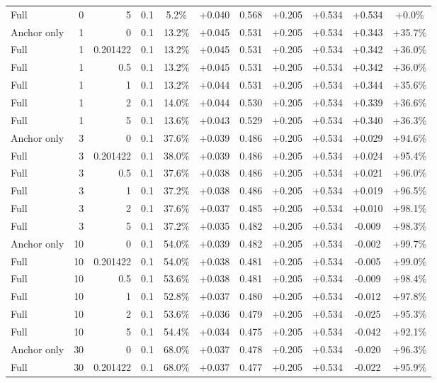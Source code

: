 \begin{table}[htbp]
\begin{tabular}{lrrrccccccc}
Full & 0 & 5 & 0.1 & 5.2\% & +0.040 & 0.568 & +0.205 & +0.534 & +0.534 & +0.0\% \\
Anchor only & 1 & 0 & 0.1 & 13.2\% & +0.045 & 0.531 & +0.205 & +0.534 & +0.343 & +35.7\% \\
Full & 1 & 0.201422 & 0.1 & 13.2\% & +0.045 & 0.531 & +0.205 & +0.534 & +0.342 & +36.0\% \\
Full & 1 & 0.5 & 0.1 & 13.2\% & +0.045 & 0.531 & +0.205 & +0.534 & +0.342 & +36.0\% \\
Full & 1 & 1 & 0.1 & 13.2\% & +0.044 & 0.531 & +0.205 & +0.534 & +0.344 & +35.6\% \\
Full & 1 & 2 & 0.1 & 14.0\% & +0.044 & 0.530 & +0.205 & +0.534 & +0.339 & +36.6\% \\
Full & 1 & 5 & 0.1 & 13.6\% & +0.043 & 0.529 & +0.205 & +0.534 & +0.340 & +36.3\% \\
Anchor only & 3 & 0 & 0.1 & 37.6\% & +0.039 & 0.486 & +0.205 & +0.534 & +0.029 & +94.6\% \\
Full & 3 & 0.201422 & 0.1 & 38.0\% & +0.039 & 0.486 & +0.205 & +0.534 & +0.024 & +95.4\% \\
Full & 3 & 0.5 & 0.1 & 37.6\% & +0.038 & 0.486 & +0.205 & +0.534 & +0.021 & +96.0\% \\
Full & 3 & 1 & 0.1 & 37.2\% & +0.038 & 0.486 & +0.205 & +0.534 & +0.019 & +96.5\% \\
Full & 3 & 2 & 0.1 & 37.6\% & +0.037 & 0.485 & +0.205 & +0.534 & +0.010 & +98.1\% \\
Full & 3 & 5 & 0.1 & 37.2\% & +0.035 & 0.482 & +0.205 & +0.534 & -0.009 & +98.3\% \\
Anchor only & 10 & 0 & 0.1 & 54.0\% & +0.039 & 0.482 & +0.205 & +0.534 & -0.002 & +99.7\% \\
Full & 10 & 0.201422 & 0.1 & 54.0\% & +0.038 & 0.481 & +0.205 & +0.534 & -0.005 & +99.0\% \\
Full & 10 & 0.5 & 0.1 & 53.6\% & +0.038 & 0.481 & +0.205 & +0.534 & -0.009 & +98.4\% \\
Full & 10 & 1 & 0.1 & 52.8\% & +0.037 & 0.480 & +0.205 & +0.534 & -0.012 & +97.8\% \\
Full & 10 & 2 & 0.1 & 53.6\% & +0.036 & 0.479 & +0.205 & +0.534 & -0.025 & +95.3\% \\
Full & 10 & 5 & 0.1 & 54.4\% & +0.034 & 0.475 & +0.205 & +0.534 & -0.042 & +92.1\% \\
Anchor only & 30 & 0 & 0.1 & 68.0\% & +0.037 & 0.478 & +0.205 & +0.534 & -0.020 & +96.3\% \\
Full & 30 & 0.201422 & 0.1 & 68.0\% & +0.037 & 0.477 & +0.205 & +0.534 & -0.022 & +95.9\% \\

\end{tabular}
\end{table}
